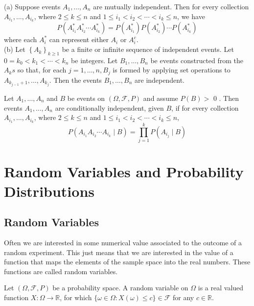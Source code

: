 \documentclass[11pt]{elegantbook}
\begin{document}
\begin{theorem}
(a) Suppose events $A_1, \ldots, A_n$ are mutually independent. Then for every collection $A_{i_1}, \ldots, A_{i_k}$, where $2 \leq k \leq n$ and $1 \leq i_1<i_2<\cdots<i_k \leq n$, we have
$$
P\left(A_{i_1}^* A_{i_2}^* \cdots A_{i_k}^*\right)=P\left(A_{i_1}^*\right) P\left(A_{i_2}^*\right) \cdots P\left(A_{i_k}^*\right)
$$
where each $A_i^*$ can represent either $A_i$ or $A_i^c$.\\
(b) Let $\left\{A_k\right\}_{k \geq 1}$ be a finite or infinite sequence of independent events. Let $0=k_0<k_1<\cdots<k_n$ be integers. Let $B_1, \ldots, B_n$ be events constructed from the $A_k s$ so that, for each $j=1, \ldots, n, B_j$ is formed by applying set operations to $A_{k_{j-1}+1}, \ldots, A_{k_j}$. Then the events $B_1, \ldots, B_n$ are independent.
\end{theorem}

\begin{definition}
Let $A_1, \ldots, A_n$ and $B$ be events on $(\Omega, \mathcal{F}, P)$ and assume $P(B)>$ 0 . Then events $A_1, \ldots, A_n$ are conditionally independent, given $B$, if for every collection $A_{i_1}, \ldots, A_{i_k}$, where $2 \leq k \leq n$ and $1 \leq i_1<i_2<\cdots<i_k \leq n$,
$$
P\left(A_{i_1} A_{i_2} \cdots A_{i_k} \mid B\right)=\prod_{j=1}^k P\left(A_{i_j} \mid B\right)
$$
\end{definition}

\chapter{Random Variables and Probability Distributions}
\section{Random Variables}
Often we are interested in some numerical value associated to the outcome of
a random experiment. This just means that we are interested in the value of a
function that maps the elements of the sample space into the real numbers. These
functions are called random variables.

\begin{definition}
Let $(\Omega, \mathcal{F}, P)$ be a probability space. A random variable on $\Omega$ is a real valued function $X: \Omega \rightarrow \mathbb{R}$, for which $\{\omega \in \Omega: X(\omega) \leq c\} \in \mathcal{F}$ for any $c \in \mathbb{R}$.
\end{definition}
\end{document}
